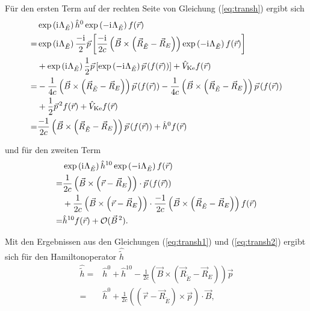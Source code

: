 	Für den ersten Term auf der rechten Seite von Gleichung (\ref{eq:transh}) ergibt sich
	\begin{equation}\label{eq:transh1}
	\begin{aligned}
	&\exp\left(\mathrm{i}\mkern1mu\Lambda_{\tilde{E}}\right)\hat{h}^0\exp\left(-\mathrm{i}\mkern1mu\Lambda_{\tilde{E}}\right)f(\vec{r})\\
	=&\exp\left(\mathrm{i}\mkern1mu\Lambda_{\tilde{E}}\right)\frac{-\mathrm{i}\mkern1mu}{2}\vec{p}\left[\frac{-\mathrm{i}\mkern1mu}{2c}\left(\vec{B}\times\left(\vec{R}_{\tilde{E}}-\vec{R}_E\right)\right)\exp\left(-\mathrm{i}\mkern1mu\Lambda_{\tilde{E}}\right)f(\vec{r})\right]\\
	&+\exp\left(\mathrm{i}\mkern1mu\Lambda_{\tilde{E}}\right)\frac{1}{2}\vec{p}\left[\exp\left(-\mathrm{i}\mkern1mu\Lambda_{\tilde{E}}\right)\vec{p}\left(f(\vec{r})\right)\right]+\hat{V}_{\textrm{Ke}}f(\vec{r})\\
	=&-\frac{1}{4c}\left(\vec{B}\times\left(\vec{R}_{\tilde{E}}-\vec{R}_E\right)\right)\vec{p}\left(f(\vec{r})\right)
	-\frac{1}{4c}\left(\vec{B}\times\left(\vec{R}_{\tilde{E}}-\vec{R}_E\right)\right)\vec{p}\left(f(\vec{r})\right)\\
	&+\frac{1}{2}\vec{p}^{\,2}f(\vec{r})+\hat{V}_{\textrm{Ke}}f(\vec{r})\\
	=&\frac{-1}{2c}\left(\vec{B}\times\left(\vec{R}_{\tilde{E}}-\vec{R}_E\right)\right)\vec{p}\left(f(\vec{r})\right)+\hat{h}^0f(\vec{r})
	\end{aligned}
	\end{equation}
	
	und für den zweiten Term
	\begin{equation}\label{eq:transh2}
	\begin{aligned}
	&\exp\left(\mathrm{i}\mkern1mu\Lambda_{\tilde{E}}\right)\hat{h}^{10}\exp\left(-\mathrm{i}\mkern1mu\Lambda_{\tilde{E}}\right)f(\vec{r})\\
	=&\frac{1}{2c}\left(\vec{B}\times\left(\vec{r}-\vec{R}_E\right)\right)\cdot\vec{p}\left(f(\vec{r})\right)\\
	&+\frac{1}{2c}\left(\vec{B}\times\left(\vec{r}-\vec{R}_E\right)\right)\cdot\frac{-1}{2c}\left(\vec{B}\times\left(\vec{R}_{\tilde{E}}-\vec{R}_E\right)\right)f(\vec{r})\\
	=&\hat{h}^{10}f(\vec{r})+\mathcal{O}(\vec{B}^{\,2}).
	\end{aligned}
	\end{equation}
	
	Mit den Ergebnissen aus den Gleichungen (\ref{eq:transh1}) und (\ref{eq:transh2}) ergibt sich für den Hamiltonoperator $\hat{\tilde{h}}$ 
	\begin{equation}
	\begin{aligned}
	\hat{\tilde{h}}=&\hat{h}^0+\hat{h}^{10}-\frac{1}{2c}\left(\vec{B}\times\left(\vec{R}_{\tilde{E}}-\vec{R}_E\right)\right)\vec{p}\\
	=&\hat{h}^0+\frac{1}{2c}\left(\left(\vec{r}-\vec{R}_{\tilde{E}}\right)\times\vec{p}\right)\cdot\vec{B},
	\end{aligned}
	\end{equation}
	
